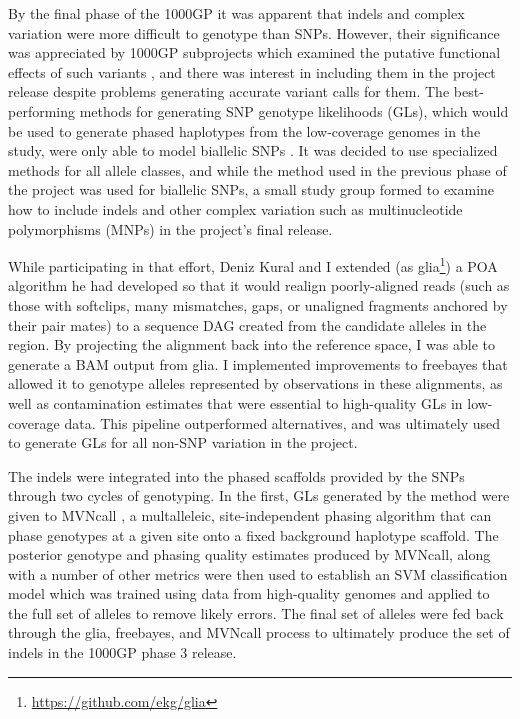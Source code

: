 By the final phase of the 1000GP \cite{1000g2015} it was apparent that indels and complex variation were more difficult to genotype than SNPs.
However, their significance was appreciated by 1000GP subprojects which examined the putative functional effects of such variants \cite{challis2015distribution}, and there was interest in including them in the project release despite problems generating accurate variant calls for them.
The best-performing methods for generating SNP genotype likelihoods (GLs), which would be used to generate phased haplotypes from the low-coverage genomes in the study, were only able to model biallelic SNPs \cite{snptools}.
It was decided to use specialized methods for all allele classes, and while the method used in the previous phase of the project was used for biallelic SNPs, a small study group formed to examine how to include indels and other complex variation such as multinucleotide polymorphisms (MNPs) in the project's final release.

While participating in that effort, Deniz Kural and I extended (as glia\footnote{\url{https://github.com/ekg/glia}}) a POA algorithm he had developed so that it would realign poorly-aligned reads (such as those with softclips, many mismatches, gaps, or unaligned fragments anchored by their pair mates) to a sequence DAG created from the candidate alleles in the region.
By projecting the alignment back into the reference space, I was able to generate a BAM output from glia.
I implemented improvements to freebayes that allowed it to genotype alleles represented by observations in these alignments, as well as contamination estimates that were essential to high-quality GLs in low-coverage data.
This pipeline outperformed alternatives, and was ultimately used to generate GLs for all non-SNP variation in the project.

The indels were integrated into the phased scaffolds provided by the SNPs through two cycles of genotyping.
In the first, GLs generated by the method were given to MVNcall \cite{menelaou2012genotype}, a multalleleic, site-independent phasing algorithm that can phase genotypes at a given site onto a fixed background haplotype scaffold.
The posterior genotype and phasing quality estimates produced by MVNcall, along with a number of other metrics were then used to establish an SVM classification model which was trained using data from high-quality genomes and applied to the full set of alleles to remove likely errors.
The final set of alleles were fed back through the glia, freebayes, and MVNcall process to ultimately produce the set of indels in the 1000GP phase 3 release.

